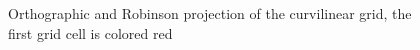 \begin{figure}[b]
\caption[curvgrid]{Orthographic and Robinson projection of the
  curvilinear grid,  the first grid cell is colored red}
\end{figure}

\newpage
